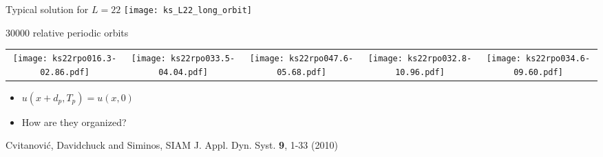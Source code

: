 \begin{frame}{Typical solution for $L=22$}
  \centering
  \texttt{[image: ks\_L22\_long\_orbit]}

\end{frame}

\begin{frame}{30000 relative periodic orbits}
 \begin{center}
\begin{tabular}{ccccc} 
\texttt{[image: ks22rpo016.3-02.86.pdf]}\hspace{-3ex} &
\texttt{[image: ks22rpo033.5-04.04.pdf]}\hspace{-3ex} &
\texttt{[image: ks22rpo047.6-05.68.pdf]}\hspace{-3ex} &
 \texttt{[image: ks22rpo032.8-10.96.pdf]}\hspace{-3ex} &
 \texttt{[image: ks22rpo034.6-09.60.pdf]}\hspace{-3ex} 
\end{tabular}
\end{center}
\begin{block}{}
  \begin{itemize}
    \item $u(x+d_p,T_p)=u(x,0)$
    \item How are they organized?
  \end{itemize}
\end{block}

\begin{block}{}
 \footnotesize{Cvitanovi\'c, Davidchuck and Siminos, SIAM J. Appl. Dyn. Syst. {\bf 9}, 1-33 (2010)}
\end{block}


\end{frame}

